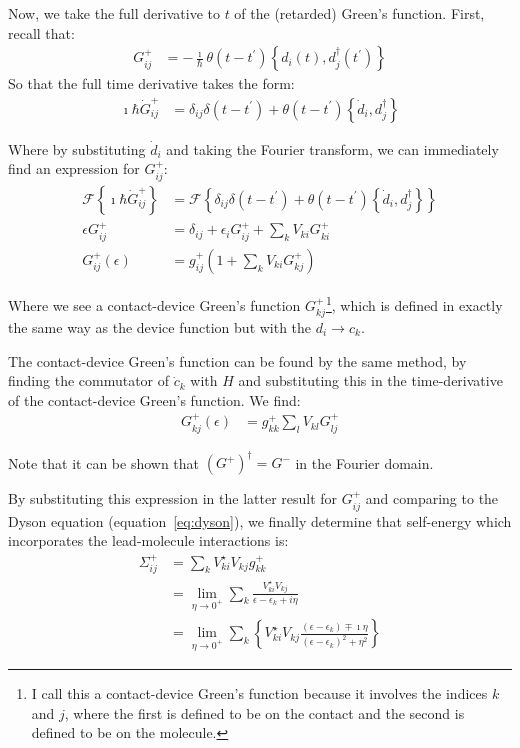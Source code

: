 Now, we take the full derivative to $t$ of the (retarded) Green's function. First, recall that:
\begin{align*}
G_{ij}^+ &= - \frac{\imath}{\hbar} \theta(t-t^\prime) \left\{ d_i(t), d_j^\dagger(t^\prime) \right\}
\end{align*}
So that the full time derivative takes the form:
\begin{align}
\imath\hbar \dot{G}_{ij}^+ &= \delta_{ij} \delta(t - t^\prime) + \theta(t-t^\prime) \left\{ \dot{d}_i, d_j^\dagger\right\}
\label{eq:eomgf}
\end{align}

Where by substituting $\dot{d}_i$ and taking the Fourier transform, we can immediately find an expression for $G_{ij}^+$:
\begin{align*} 
\mathscr{F}\left\{ \imath\hbar \dot{G}_{ij}^+ \right\}&= \mathscr{F}\left\{\delta_{ij} \delta(t - t^\prime)  + \theta(t-t^\prime) \left\{ \dot{d}_i, d_j^\dagger\right\} \right\}\\
\epsilon G_{ij}^+ &= \delta_{ij} + \epsilon_i G^+_{ij}+ \sum_k V_{ki} G^+_{ki}\\
G_{ij}^+ (\epsilon) &= g_{ij}^+ \left( 1 + \sum_{k} V_{ki} G_{kj}^+ \right)
\end{align*}

Where we see a contact-device Green's function $G_{kj}^+$\footnote{I call this a contact-device Green's function because it involves the indices $k$ and $j$, where the first is defined to be on the contact and the second is defined to be on the molecule.}, which is defined in exactly the same way as the device function but with the $d_i \rightarrow c_{k}$.

The contact-device Green's function can be found by the same method, by finding the commutator of $\dot{c}_{k}$ with $H$ and substituting this in the time-derivative of the contact-device Green's function. We find:
\begin{align*}
G_{kj}^+ (\epsilon) &= g_{kk}^+ \sum_l V_{kl} G_{lj}^+
\end{align*}

Note that it can be shown that $(G^+)^\dagger=G^-$ in the Fourier domain.

By substituting this expression in the latter result for $G_{ij}^+$ and comparing to the Dyson equation (equation~\ref{eq:dyson}), we finally determine that self-energy which incorporates the lead-molecule interactions is:
\begin{align*}
\Sigma_{ij}^+ &= \sum_{k} V_{ki}^\star V_{kj} g_{kk}^+ \\
&= \lim_{\eta\rightarrow 0^+} \sum_{k}\frac{ V_{ki}^\star V_{kj}}{\epsilon-\epsilon_{k} + i\eta} \\
&= \lim_{\eta\rightarrow 0^+}\sum_{k} \left\{V_{ki}^\star V_{kj} \frac{ \left(\epsilon-\epsilon_{k}\right) \mp \imath \eta}{  \left(\epsilon-\epsilon_{k}\right)^2 + \eta^2}\right\}
\end{align*} 


